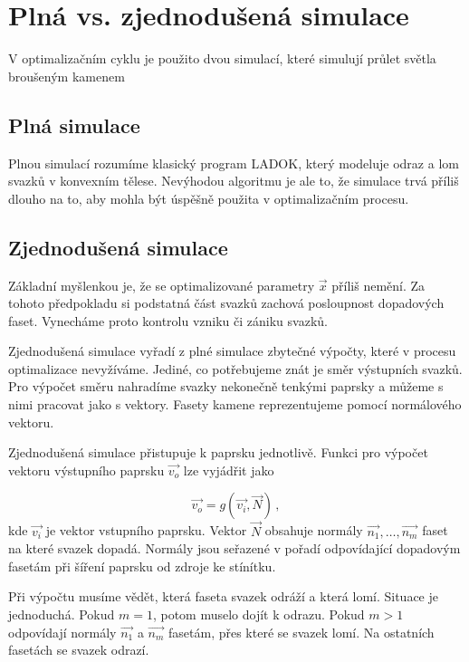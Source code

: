 \section{Plná vs. zjednodušená simulace}
V optimalizačním cyklu je použito dvou simulací, které simulují průlet světla broušeným kamenem

\subsection{Plná simulace}
Plnou simulací rozumíme klasický program LADOK, který modeluje odraz a lom svazků v konvexním tělese. Nevýhodou algoritmu je ale to, že simulace trvá příliš dlouho na to, aby mohla být úspěšně použita v optimalizačním procesu.

\subsection{Zjednodušená simulace}
Základní myšlenkou je, že se optimalizované parametry $\vec{x}$ příliš nemění. Za tohoto předpokladu si podstatná část svazků zachová posloupnost dopadových faset. Vynecháme proto kontrolu vzniku či zániku svazků. 

Zjednodušená simulace vyřadí z plné simulace zbytečné výpočty, které v procesu optimalizace nevyžíváme. 
Jediné, co potřebujeme znát je směr výstupních svazků. Pro výpočet směru nahradíme svazky nekonečně tenkými paprsky a můžeme s nimi pracovat jako s vektory. Fasety kamene reprezentujeme pomocí normálového vektoru. 

Zjednodušená simulace přistupuje k paprsku jednotlivě. Funkci pro výpočet vektoru výstupního paprsku $\vec{v_o}$ lze vyjádřit jako  

\begin{equation}
\vec{v_o}= g\left(\vec{v_i},\vec{N} \right)\,,
\end{equation}
kde $\vec{v_i}$ je vektor vstupního paprsku. Vektor $\vec{N}$ obsahuje normály $\vec{n_1},\dots,\vec{n_m}$ faset na které svazek dopadá. Normály jsou seřazené v pořadí odpovídající dopadovým fasetám při šíření paprsku od zdroje ke stínítku. 

Při výpočtu musíme vědět, která faseta svazek odráží a která lomí. Situace je jednoduchá. Pokud $m = 1$, potom muselo dojít k odrazu. Pokud  $m > 1$  odpovídají normály $\vec{n_1}$ a $\vec{n_m}$ fasetám, přes které se svazek lomí. Na ostatních fasetách se svazek odrazí. 








